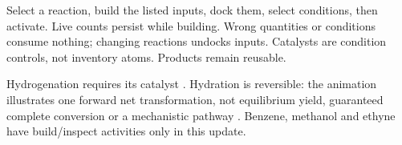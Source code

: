Select a reaction, build the listed inputs, dock them, select conditions, then activate. Live counts persist while building. Wrong quantities or conditions consume nothing; changing reactions undocks inputs. Catalysts are condition controls, not inventory atoms. Products remain reusable.

Hydrogenation requires its catalyst \cite{hydrogenation}. Hydration is reversible: the animation illustrates one forward net transformation, not equilibrium yield, guaranteed complete conversion or a mechanistic pathway \cite{hydration}. Benzene, methanol and ethyne have build/inspect activities only in this update.

